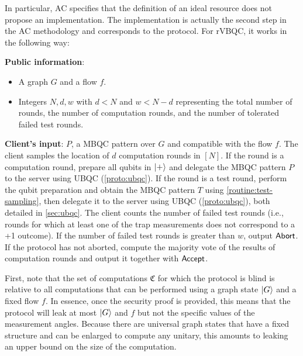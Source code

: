 In particular, AC specifies that the definition of an ideal resource does not propose an implementation. The implementation is actually the second step in the AC methodology and corresponds to the protocol. For rVBQC, it works in the following way:
\begin{protocol}[rVBQC]
\label{proto:rvbqc}
\item
  \begin{algorithmic}[0]
    \State \textbf{Public information}: 
    \begin{itemize}
    \item A graph \(G\) and a flow \(f\).
    \item Integers \(N,d,w\) with \(d < N\) and \(w  < N-d\) representing the total number of rounds, the number of computation rounds, and the number of tolerated failed test rounds.
    \end{itemize}
    \State \textbf{Client's input}: \(P\), a MBQC pattern over \(G\) and compatible with the flow \(f\).
    \State The client samples the location of \(d\) computation rounds in \([N]\).
    \State If the round is a computation round, prepare all qubits in \(\ket+\) and delegate the MBQC pattern \(P\) to the server using UBQC (\cref{proto:ubqc}).
    \State If the round is a test round, perform the qubit preparation and obtain the MBQC pattern \(T\) using \cref{routine:test-sampling}, then delegate it to the server using UBQC (\cref{proto:ubqc}), both detailed in \cref{sec:ubqc}.
    \EndProcedure
    \State The client counts the number of failed test rounds (i.e., rounds for which at least one of the trap measurements does not correspond to a +1 outcome).
  \State If the number of failed test rounds is greater than \(w\), output \(\mathsf{Abort}\).
  \EndProcedure
  \State If the protocol has not aborted, compute the majority vote of the results of computation rounds and output it together with \(\mathsf{Accept}\).
  \EndProcedure
  \end{algorithmic}
\end{protocol}
First, note that the set of computations  \(\mathfrak{C}\) for which the protocol is blind is relative to all computations that can be performed using a graph state \(\ket G\) and a fixed flow $f$. In essence, once the security proof is provided, this means that the protocol will leak at most \(\ket G\) and $f$ but not the specific values of the measurement angles. Because there are universal graph states that have a fixed structure and can be enlarged to compute any unitary, this amounts to leaking an upper bound on the size of the computation.

